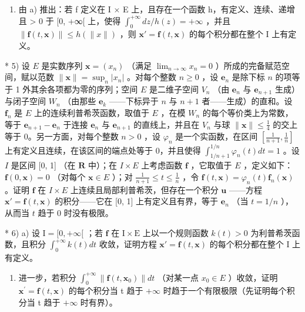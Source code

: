 \begin{enumerate}
\def\labelenumi{\alph{enumi})}
\setcounter{enumi}{1}
\tightlist
\item
  由 a) 推出：若 f 定义在 I × E 上，且存在一个函数 h，有定义、连续、递增且 \textgreater{} 0 于 {[}0, +∞{[} 上，使得 \(\int_{0}^{+\infty} dz / h(z) = +\infty\) ，并且 \(\|\mathbf{f}(t, \mathbf{x})\| \leqslant h(\|x\|)\) ，则 \(\mathbf{x}' = \mathbf{f}(t, \mathbf{x})\) 的每个积分都在整个 I 上有定义。
\end{enumerate}

* 5) 设 \(E\) 是实数序列 \(\mathbf{x} = (x_{n})\) （满足 \(\lim_{n\to \infty}x_n = 0\) ）所成的完备赋范空间，赋以范数 \(\| \mathbf{x}\| = \sup_n|x_n|\) 。对每个整数 \(n\geqslant 0\) ，设 \(\mathbf{e}_n\) 是除下标 \(n\) 的项等于 1 外其余各项都为零的序列；空间 \(E\) 是二维子空间 \(V_{n}\) （由 \(\mathbf{e}_n\) 与 \(\mathbf{e}_{n + 1}\) 生成）与闭子空间 \(W_{n}\) （由那些 \(\mathbf{e}_k\) ——下标异于 \(n\) 与 \(n + 1\) 者——生成）的直和。设 \(\mathbf{f}_n\) 是 \(E\) 上的连续利普希茨函数，取值于 \(E\) ，在模 \(W_{n}\) 的每个等价类上为常数，等于 \(\mathbf{e}_{n + 1} - \mathbf{e}_n\) 于连接 \(\mathbf{e}_n\) 与 \(\mathbf{e}_{n + 1}\) 的直线上，并且在 \(V_{n}\) 与球 \(\| \mathbf{x}\| \leqslant \frac{1}{4}\) 的交上等于 0。另一方面，对每个整数 \(n > 0\) ，设 \(\varphi_{n}\) 是一个实函数，在区间 \(\left[\frac{1}{n + 1},\frac{1}{n}\right]\) 上有定义且连续，在该区间的端点处等于 0，并且使得 \(\int_{1 / n + 1}^{1 / n}\varphi_n(t)dt = 1\) 。设 \(I\) 是区间 {[}0, 1{]} （在 \(\mathbf{R}\) 中）；在 \(I\times E\) 上考虑函数 \(\mathbf{f}\) ，它取值于 \(E\) ，定义如下：\(\mathbf{f}(0,\mathbf{x}) = 0\) （对每个 \(\mathbf{x}\in E\) ）；对 \(\frac{1}{n + 1}\leqslant t\leqslant \frac{1}{n}\) ，令 \(\mathbf{f}(t,\mathbf{x}) = \varphi_n(t)\mathbf{f}_n(\mathbf{x})\) 。证明 \(\mathbf{f}\) 在 \(I\times E\) 上连续且局部利普希茨，但存在一个积分 \(\mathbf{u}\) ——方程 \(\mathbf{x}' = \mathbf{f}(t,\mathbf{x})\) 的积分——它在 {[}0, 1{]} 上有定义且有界，等于 \(\mathbf{e}_n\) （当 \(t = 1 / n\) ），从而当 \(t\) 趋于 0 时没有极限。

* 6) a) 设 \(\mathrm{I} = [0, +\infty[\) ；若 \(\mathbf{f}\) 在 \(\mathrm{I} \times \mathrm{E}\) 上以一个规则函数 \(k(t) > 0\) 为利普希茨函数，且积分 \(\int_0^{+\infty} k(t) dt\) 收敛，证明方程 \(\mathbf{x}' = \mathbf{f}(t, \mathbf{x})\) 的每个积分都在整个 \(\mathrm{I}\) 上有定义。

\begin{enumerate}
\def\labelenumi{\alph{enumi})}
\setcounter{enumi}{1}
\tightlist
\item
  进一步，若积分 \(\int_{0}^{+\infty}\|\mathbf{f}(t,\mathbf{x}_{0})\|dt\) （对某一点 \(x_{0}\in E\) ）收敛，证明 \(\mathbf{x}^{\prime}=\mathbf{f}(t,\mathbf{x})\) 的每个积分当 t 趋于 \(+\infty\) 时趋于一个有限极限（先证明每个积分当 t 趋于 \(+\infty\) 时有界）。
\end{enumerate}

